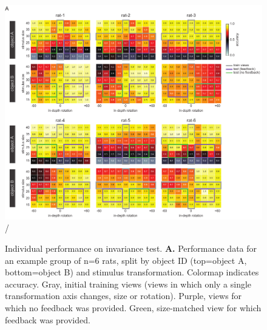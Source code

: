 \begin{figure}[t!]
\includegraphics[width=\textwidth]{figures/supplemental/fig_s3_heatmaps_per_rat/fig_s3_heatmaps_per_rat.pdf}/
    \vspace{.1in}
    \caption[Individual invariance performance]{Individual performance on invariance test.
    \textbf{A.} Performance data for an example group of n=6 rats, split by object ID (top=object A, bottom=object B) and stimulus transformation. Colormap indicates accuracy. Gray, initial training views (views in which only a single transformation axis changes, size or rotation). Purple, views for which no feedback was provided. Green, size-matched view for which feedback was provided. 
    \label{supfig:heatmaps}}
\end{figure}

